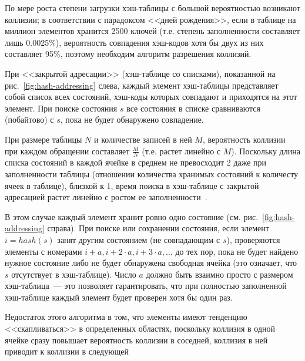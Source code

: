 По мере роста степени загрузки хэш-таблицы с большой вероятностью возникают коллизии; в
соответствии с парадоксом <<дней рождения>>, если в таблице на миллион элементов хранится
2500 ключей (т.е. степень заполненности составляет лишь 0.0025\%), вероятность совпадения
хэш-кодов хотя бы двух из них составляет 95\%, поэтому необходим алгоритм разрешения
коллизий.


При <<закрытой адресации>> (хэш-таблице со списками), показанной на
рис.~\ref{fig:hash-addressing} слева, каждый элемент хэш-таблицы представляет собой список
всех состояний, хэш-коды которых совпадают и приходятся на этот элемент. При поиске
состояния $s$ все состояния в списке сравниваются (побайтово) с $s$, пока не будет
обнаружено совпадение.

При размере таблицы $N$ и количестве записей в ней $M$, вероятность коллизии при каждом
обращении составляет $\frac{M}{N}$ (т.е. растет линейно с $M$). Поскольку длина списка
состояний в каждой ячейке в среднем не превосходит 2 даже при заполненности таблицы
(отношении количества хранимых состояний к количесту ячеек в таблице), близкой к 1, время
поиска в хэш-таблице с закрытой адресацией растет линейно с ростом ее
заполненности~\cite{CDataStructures}.


В этом случае каждый элемент хранит ровно одно состояние
(см. рис.~\ref{fig:hash-addressing} справа). При поиске или сохранении состояния, если
элемент $i = hash(s)$ занят другим состоянием (не совпадающим с $s$), проверяются элементы
с номерами $i + a, i + 2 \cdot a, i + 3 \cdot a, \ldots$ до тех пор, пока не будет найдено
нужное состояние либо не будет обнаружена свободная ячейка (это означает, что $s$
отсутствует в хэш-таблице). Число $a$ должно быть взаимно просто с размером
хэш-таблица~--- это позволяет гарантировать, что при полностью заполненной хэш-таблице
каждый элемент будет проверен хотя бы один раз.

Недостаток этого алгоритма в том, что элементы имеют тенденцию <<скапливаться>> в
определенных областях, поскольку коллизия в одной ячейке сразу повышает вероятность
коллизии в соседней, коллизия в ней приводит к коллизии в следующей\etc

